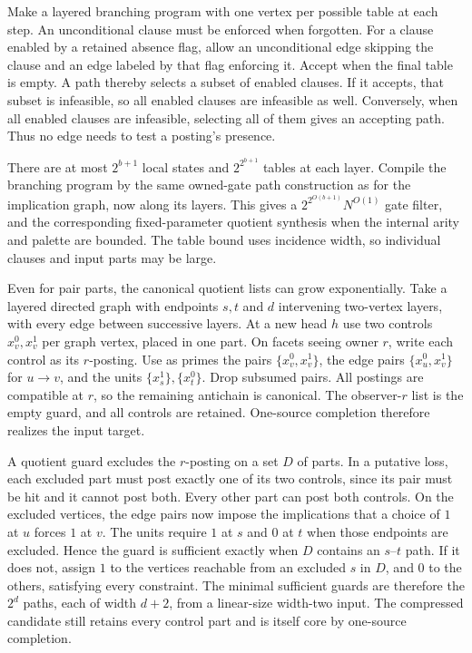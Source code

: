 Make a layered branching program
with one vertex per possible table
at each step. An unconditional
clause must be enforced when forgotten.
For a clause enabled by a retained
absence flag, allow an unconditional
edge skipping the clause and an edge
labeled by that flag enforcing it.
Accept when the final table is empty.
A path thereby selects a subset of
enabled clauses. If it accepts, that
subset is infeasible, so all enabled
clauses are infeasible as well.
Conversely, when all enabled clauses
are infeasible, selecting all of them
gives an accepting path. Thus no
edge needs to test a posting's
presence.

There are at most $2^{b+1}$ local
states and $2^{2^{b+1}}$ tables at
each layer. Compile the branching
program by the same owned-gate path
construction as for the implication
graph, now along its layers. This
gives a $2^{2^{O(b+1)}}N^{O(1)}$ gate
filter, and the corresponding
fixed-parameter quotient synthesis
when the internal arity and palette
are bounded. The table bound uses
incidence width, so individual
clauses and input parts may be large.

Even for pair parts, the canonical
quotient lists can grow exponentially.
Take a layered directed graph with
endpoints $s,t$ and $d$ intervening
two-vertex layers, with every edge
between successive layers. At a new
head $h$ use two controls $x_v^0,x_v^1$
per graph vertex, placed in one part.
On facets seeing owner $r$, write each
control as its $r$-posting. Use as primes
the pairs $\{x_v^0,x_v^1\}$, the edge
pairs $\{x_u^0,x_v^1\}$ for $u\to v$,
and the units $\{x_s^1\},\{x_t^0\}$.
Drop subsumed pairs. All postings are
compatible at $r$, so the remaining
antichain is canonical. The observer-$r$
list is the empty guard, and all controls
are retained. One-source completion
therefore realizes the input target.

A quotient guard excludes the $r$-posting
on a set $D$ of parts. In a putative loss,
each excluded part must post exactly one
of its two controls, since its pair must
be hit and it cannot post both. Every
other part can post both controls. On
the excluded vertices, the edge pairs
now impose the implications that a choice
of $1$ at $u$ forces $1$ at $v$.
The units require $1$ at $s$ and $0$
at $t$ when those endpoints are excluded.
Hence the guard is sufficient exactly
when $D$ contains an $s$--$t$ path.
If it does not, assign $1$ to the vertices
reachable from an excluded $s$ in $D$,
and $0$ to the others, satisfying every
constraint. The minimal sufficient
guards are therefore the $2^d$ paths,
each of width $d+2$, from a linear-size
width-two input. The compressed candidate
still retains every control part and is
itself core by one-source completion.

